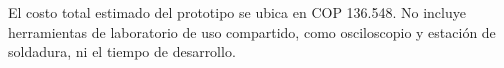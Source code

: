 \begin{landscape}
El costo total estimado del prototipo se ubica en COP 136.548. No incluye herramientas de laboratorio de uso compartido, como osciloscopio y estación de soldadura, ni el tiempo de desarrollo.

\clearpage
\makeatletter
\let\ps@plain\ufps@plain@orig
\makeatother
\pagestyle{plain}
\end{landscape}

